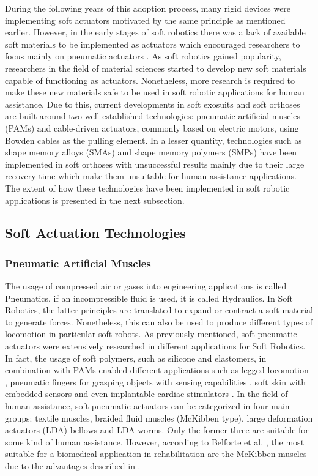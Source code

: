 During the following years of this adoption process, many rigid devices were implementing soft actuators motivated by the same principle as mentioned earlier. However, in the early stages of soft robotics there was a lack of available soft materials to be implemented as actuators which encouraged researchers to focus mainly on pneumatic actuators \cite{Belforte2014}. As soft robotics gained popularity, researchers in the field of material sciences started to develop new soft materials capable of functioning as actuators. Nonetheless, more research is required to make these new materials safe to be used in soft robotic applications for human assistance. Due to this, current developments in soft exosuits and soft orthoses are built around two well established technologies: pneumatic artificial muscles (PAMs) and cable-driven actuators, commonly based on electric motors, using Bowden cables as the pulling element. In a lesser quantity, technologies such as shape memory alloys (SMAs) and shape memory polymers (SMPs) have been implemented in soft orthoses with unsuccessful results mainly due to their large recovery time which make them unsuitable for human assistance applications. The extent of how these technologies have been implemented in soft robotic applications is presented in the next subsection.

\subsection{Soft Actuation Technologies} \label{sec:SoftActuation}

\subsubsection{Pneumatic Artificial Muscles} \label{sec:PMAs}

The usage of compressed air or gases into engineering applications is called Pneumatics, if an incompressible fluid is used, it is called Hydraulics. In Soft Robotics, the latter principles are translated to expand or contract a soft material to generate forces. Nonetheless, this can also be used to produce different types of locomotion in particular soft robots. As previously mentioned, soft pneumatic actuators were extensively researched in different applications for Soft Robotics. In fact, the usage of soft polymers, such as silicone and elastomers, in combination with PAMs enabled different applications such as legged locomotion \cite{Florez2014}, pneumatic fingers for grasping objects with sensing capabilities \cite{Morrow2015}, soft skin with embedded sensors \cite{Sonar2016,Suh2014} and even implantable cardiac stimulators \cite{Roche2014}. In the field of human assistance, soft pneumatic actuators can be categorized in four main groups: textile muscles, braided fluid muscles (McKibben type), large deformation actuators (LDA) bellows and LDA worms. Only the former three are suitable for some kind of human assistance. However, according to Belforte et al. \cite{Belforte2014}, the most suitable for a biomedical application in rehabilitation are the McKibben muscles due to the advantages described in .

